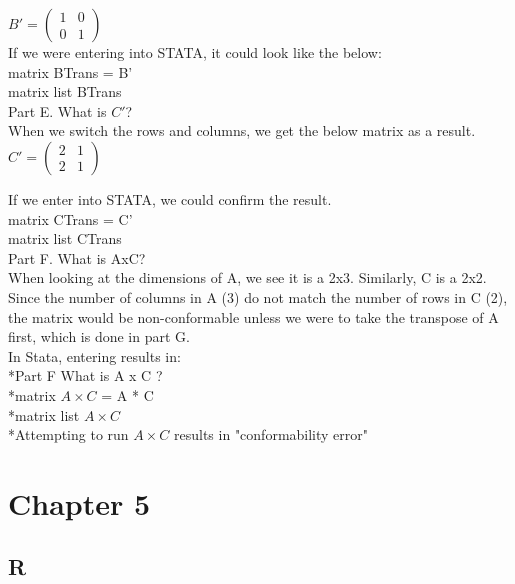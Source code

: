 \documentclass{article}
\begin{document}
$B' = \left( \begin{smallmatrix} 1&0\\0&1 \end{smallmatrix} \right)$\\

If we were entering into STATA, it could look like the below:\\

matrix BTrans = B'\\
matrix list BTrans\\

Part E. What is $C'$?\\

When we switch the rows and columns, we get the below matrix as a result.\\

$C' = \left( \begin{smallmatrix} 2&1\\2&1 \end{smallmatrix} \right)$

If we enter into STATA, we could confirm the result.\\

matrix CTrans = C'\\
matrix list CTrans\\

Part F. What is AxC?\\

When looking at the dimensions of A, we see it is a 2x3. Similarly, C is a 2x2. Since the number of columns in A (3) do not match the number of rows in C (2), the matrix would be non-conformable unless we were to take the transpose of A first, which is done in part G.\\

In Stata, entering results in:\\
*Part F What is A x C ?\\
*matrix $A \times C$ = A * C\\
*matrix list $A\times C$\\
*Attempting to run $A\times C$ results in "conformability error" \\

\section{Chapter 5}

\subsection{R}
\end{document}
